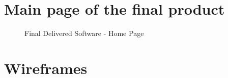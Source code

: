 \documentclass{l3proj}
\begin{document}
\section{Main page of the final product}
\label{appendix:main}

\begin{figure}[H]
  \centering
  \caption{Final Delivered Software - Home Page}
  \label{fig:Final Home Page}
\end{figure}


\section{Wireframes}
\label{appendix:wireframes}
\end{document}

